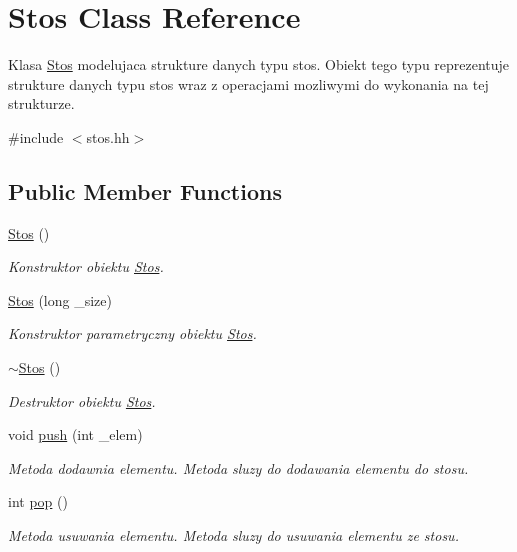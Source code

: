 \hypertarget{class_stos}{}\section{Stos Class Reference}
\label{class_stos}


Klasa \hyperlink{class_stos}{Stos} modelujaca strukture danych typu stos. Obiekt tego typu reprezentuje strukture danych typu stos wraz z operacjami mozliwymi do wykonania na tej strukturze.  




{\ttfamily \#include $<$stos.\+hh$>$}

\subsection*{Public Member Functions}
\begin{DoxyCompactItemize}
\item 
\hyperlink{class_stos_a1de3b50386d5dfb56ddece17d0ea2389}{Stos} ()
\begin{DoxyCompactList}\small\item\em Konstruktor obiektu \hyperlink{class_stos}{Stos}. \end{DoxyCompactList}\item 
\hyperlink{class_stos_a6606affc11eed2b059b8caf287ffca25}{Stos} (long \+\_\+size)
\begin{DoxyCompactList}\small\item\em Konstruktor parametryczny obiektu \hyperlink{class_stos}{Stos}. \end{DoxyCompactList}\item 
\hyperlink{class_stos_af9a198e2540e18adcc0b5259105fd78e}{$\sim$\+Stos} ()
\begin{DoxyCompactList}\small\item\em Destruktor obiektu \hyperlink{class_stos}{Stos}. \end{DoxyCompactList}\item 
void \hyperlink{class_stos_afd5802e405946328cccca3eed676b493}{push} (int \+\_\+elem)
\begin{DoxyCompactList}\small\item\em Metoda dodawnia elementu. Metoda sluzy do dodawania elementu do stosu. \end{DoxyCompactList}\item 
int \hyperlink{class_stos_aabb14b8a389c55da6e2b50fbb179ed56}{pop} ()
\begin{DoxyCompactList}\small\item\em Metoda usuwania elementu. Metoda sluzy do usuwania elementu ze stosu. \end{DoxyCompactList}\end{DoxyCompactItemize}
